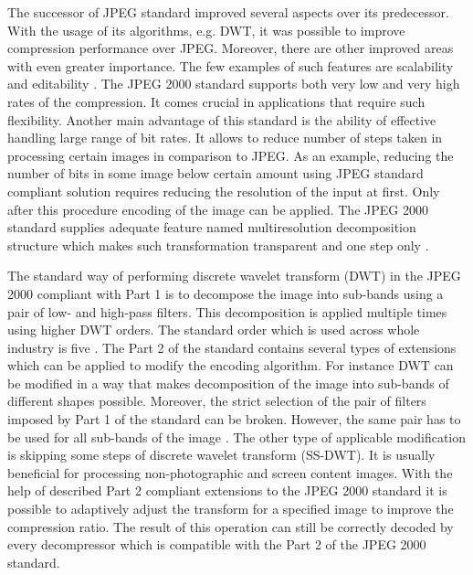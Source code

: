 The successor of JPEG standard improved several aspects over its predecessor. With the usage of its algorithms,
e.g. DWT, it was possible to improve compression performance over JPEG. Moreover, there are other improved areas
with even greater importance. The few examples of such features are scalability and editability \cite{jpeg2000}.
The JPEG 2000 standard supports both very low and very high rates of the compression. It comes crucial
in applications that require such flexibility. Another main advantage of this standard is the ability of
effective handling large range of bit rates. It allows to reduce number of steps taken in processing
certain images in comparison to JPEG. As an example, reducing the number of bits in some image below certain
amount using JPEG standard compliant solution requires reducing the resolution of the input at first.
Only after this procedure encoding of the image can be applied. The JPEG 2000 standard supplies adequate feature
named multiresolution decomposition structure which makes such transformation transparent and one step only \cite{jpeg2000}.

The standard way of performing discrete wavelet transform (DWT) in the JPEG 2000 compliant with Part 1 is to decompose
the image into sub-bands using a pair of low- and high-pass filters. This decomposition is applied multiple times using
higher DWT orders. The standard order which is used across whole industry is five \cite{jpeg_suite} \cite{jpeg_summary}.
The Part 2 of the standard contains several types of extensions which can be applied to modify the encoding
algorithm. For instance DWT can be modified in a way that makes decomposition of the image into sub-bands of different
shapes possible. Moreover, the strict selection of the pair of filters imposed by Part 1 of the standard can be
broken. However, the same pair has to be used for all sub-bands of the image \cite{jpeg_suite}. The other type of applicable
modification is skipping some steps of discrete wavelet transform (SS-DWT). It is usually beneficial for processing
non-photographic and screen content images.
With the help of described Part 2 compliant extensions to the JPEG 2000 standard it is possible to adaptively
adjust the transform for a specified image to improve the compression ratio. The result of this operation can still
be correctly decoded by every decompressor which is compatible with the Part 2 of the JPEG 2000 standard.

